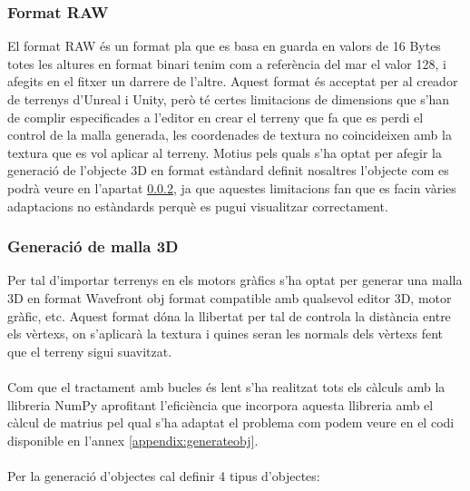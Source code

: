 \documentclass[10pt,a4paper,twocolumn,twoside]{article}
\begin{document}
\subsubsection{Format RAW}
El format RAW és un format pla que es basa en guarda en valors de 16 Bytes totes les altures en format binari tenim com a referència del mar el valor 128, i afegits en el fitxer un darrere de l'altre. Aquest format és acceptat per al creador de terrenys d'Unreal i Unity, però té certes limitacions de dimensions que s'han de complir especificades a l'editor en crear el terreny que fa que es perdi el control de la malla generada, les coordenades de textura no coincideixen amb la textura que es vol aplicar al terreny. Motius pels quals s'ha optat per afegir la generació de l'objecte 3D en format estàndard definit nosaltres l'objecte com es podrà veure en l'apartat \ref{mesh3d}, ja que aquestes limitacions fan que es facin vàries adaptacions no estàndards perquè es pugui visualitzar correctament.

\subsubsection{Generació de malla 3D}
\label{mesh3d}
Per tal d'importar terrenys en els motors gràfics s'ha optat per generar una malla 3D en format Wavefront obj\cite{wavefrontobj} format compatible amb qualsevol editor 3D, motor gràfic, etc. Aquest format dóna la llibertat per tal de controla la distància entre els vèrtexs, on s'aplicarà la textura i quines seran les normals dels vèrtexs fent que el terreny sigui suavitzat.
\\
\\
Com que el tractament amb bucles és lent s'ha realitzat tots els càlculs amb la llibreria NumPy aprofitant l'eficiència que incorpora aquesta llibreria amb el càlcul de matrius pel qual s'ha adaptat el problema com podem veure en el codi disponible en l'annex \ref{appendix:generateobj}.
\\
\\
Per la generació d'objectes cal definir 4 tipus d'objectes:
\end{document}
